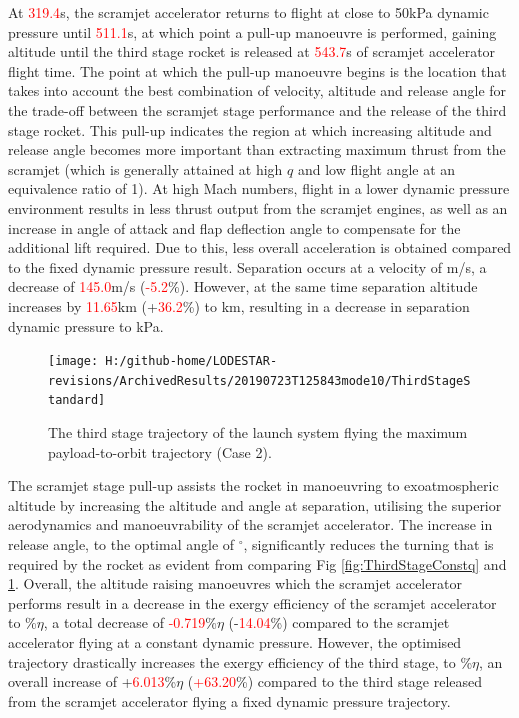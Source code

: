 At \textcolor{red}{319.4}s, the scramjet accelerator returns to flight at close to 50kPa dynamic pressure until \textcolor{red}{511.1}s, at which point a pull-up manoeuvre is performed, gaining altitude until the third stage rocket is released at \textcolor{red}{543.7}s of scramjet accelerator flight time. 
 The point at which the pull-up manoeuvre begins is the location that takes into account the best combination of velocity, altitude and release angle for the trade-off between the scramjet stage performance and the release of the third stage rocket. This pull-up indicates the region at which increasing altitude and release angle becomes more important than extracting maximum thrust from the scramjet (which is generally attained at high $q$ and low flight angle at an equivalence ratio of 1).
At high Mach numbers, flight in a lower dynamic pressure environment results in less thrust output from the scramjet engines, as well as an increase in angle of attack and flap deflection angle to compensate for the additional lift required. Due to this, less overall acceleration is obtained compared to the fixed dynamic pressure result. Separation occurs at a velocity of \secondthirdSeparationvStandardNoReturn m/s, a decrease of \textcolor{red}{145.0}m/s (\textcolor{red}{-5.2}\%). However, at the same time separation altitude increases by \textcolor{red}{11.65}km (+\textcolor{red}{36.2}\%) to \secondthirdSeparationAltqStandardNoReturn km, resulting in a decrease in separation dynamic pressure to \secondthirdSeparationqStandardNoReturn kPa. 
\begin{figure}[ht!]%
	\centering
	\texttt{[image: H:/github-home/LODESTAR-revisions/ArchivedResults/20190723T125843mode10/ThirdStageStandard]}
	\caption{The third stage trajectory of the launch system flying the maximum payload-to-orbit trajectory (Case 2).}
	\label{fig:ThirdStageStandardNoReturn}
\end{figure}
The scramjet stage pull-up assists the rocket in manoeuvring to exoatmospheric altitude by increasing the altitude and angle at separation, utilising the superior aerodynamics and manoeuvrability of the scramjet accelerator. The increase in release angle, to the optimal angle of \secondthirdSeparationgammaStandardNoReturn$^\circ$, significantly reduces the turning that is required by the rocket as evident from comparing Fig \ref{fig:ThirdStageConstq} and \ref{fig:ThirdStageStandardNoReturn}. 
Overall, the altitude raising manoeuvres which the scramjet accelerator performs result in a decrease in the exergy efficiency of the scramjet accelerator to \secondExergyEffStandardNoReturn\%$\eta$, a total decrease of \textcolor{red}{-0.719}\%$\eta$ (-\textcolor{red}{14.04}\%) compared to the scramjet accelerator flying at a constant dynamic pressure. However, the optimised trajectory drastically increases the exergy efficiency of the third stage, to \thirddExergyEffStandardNoReturn\%$\eta$, an overall increase of +\textcolor{red}{6.013}\%$\eta$ (\textcolor{red}{+63.20}\%) compared to the third stage released from the scramjet accelerator flying a fixed dynamic pressure trajectory.  
